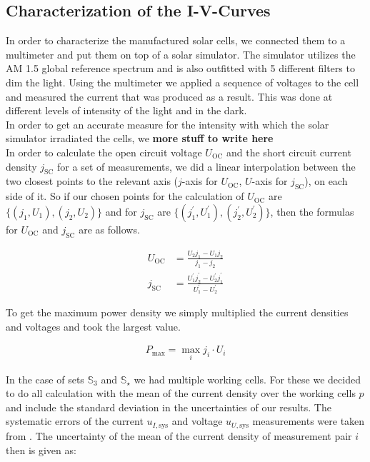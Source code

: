 \documentclass[a4paper,10pt,twocolumn]{article}
\begin{document}
\begin{extract*}

\newcommand{\Uoc}{U_{\text{OC}}}
\newcommand{\jsc}{j_{\text{SC}}}
\newcommand{\Pmax}{P_{\text{max}}}
\newcommand{\meanp}[1]{\langle #1 \rangle_p}

\section{Characterization of the I-V-Curves}\label{sec:charac}

In order to characterize the manufactured solar cells, we connected them to a multimeter and put them on top of a solar simulator. The simulator utilizes the AM 1.5 global reference spectrum and is also outfitted with 5 different filters to dim the light. Using the multimeter we applied a sequence of voltages to the cell and measured the current that was produced as a result. This was done at different levels of intensity of the light and in the dark.\\
In order to get an accurate measure for the intensity with which the solar simulator irradiated the cells, we \textbf{more stuff to write here}\\
In order to calculate the open circuit voltage $\Uoc$ and the short circuit current density $\jsc$ for a set of measurements, we did a linear interpolation between the two closest points to the relevant axis ($j$-axis for $\Uoc$, $U$-axis for $\jsc$), on each side of it. So if our chosen points for the calculation of $\Uoc$ are $\{(j_1,U_1),(j_2,U_2)\}$ and for $\jsc$ are $\{(j_1^\prime,U_1^\prime),(j_2^\prime,U_2^\prime)\}$, then the formulas for $\Uoc$ and $\jsc$ are as follows.

\begin{align}
	\Uoc &= \frac{U_2 j_1 - U_1 j_2}{j_1-j_2}\\
	\jsc &= \frac{U_1^\prime j_2^\prime - U_2^\prime j_1^\prime}{U_1^\prime-U_2^\prime}
\end{align}

To get the maximum power density we simply multiplied the current densities and voltages and took the largest value.

\begin{align}
	\Pmax = \max_{i} j_i\cdot U_i
\end{align}

In the case of sets $\mathbb{S}_3$ and $\mathbb{S}_\star$ we had multiple working cells. For these we decided to do all calculation with the mean of the current density over the working cells $p$ and include the standard deviation in the uncertainties of our results. The systematic errors of the current $u_{I,\text{sys}}$ and voltage $u_{U,\text{sys}}$ measurements were taken from \cite{keithley}. The uncertainty of the mean of the current density of measurement pair $i$ then is given as:


\end{extract*}
\end{document}
